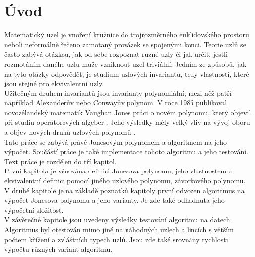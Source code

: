 \chapter*{Úvod}

Matematický uzel je vnoření kružnice do trojrozměrného euklidovského prostoru neboli neformálně řečeno zamotaný provázek se spojenými konci. Teorie uzlů se často zabývá otázkou, jak od sebe rozpoznat různé uzly či jak určit, jestli rozmotáním daného uzlu může vzniknout uzel triviální. Jedním ze způsobů, jak na tyto otázky odpovědět, je studium uzlových invariantů, tedy vlastností, které jsou stejné pro ekvivalentní uzly.
\\
Užitečným druhem invariantů jsou invarianty polynomiální, mezi něž patří například Alexanderův nebo	 Conwayův polynom. 
V roce 1985 publikoval novozélandský matematik Vaughan Jones práci o novém polynomu, který objevil při studiu operátorových algeber  \cite{jones1985}. 
Jeho výsledky měly velký vliv na vývoj oboru a objev nových druhů uzlových polynomů \cite{cromwell2004knots}.
\\
Tato práce se zabývá právě Jonesovým polynomem a algoritmem na jeho výpočet. Součástí práce je také implementace tohoto algoritmu a jeho testování.
\\

Text práce je rozdělen do tří kapitol. 
\\
První kapitola je věnována definici Jonesova polynomu, jeho vlastnostem a ekvivalentní definici pomocí jiného uzlového polynomu, závorkového polynomu.
\\
V druhé kapitole je na základě poznatků kapitoly první odvozen algoritmus na výpočet Jonesova polynomu a jeho varianty. Je zde také odhadnuta jeho výpočetní složitost.
\\
V závěrečné kapitole jsou uvedeny výsledky testování algoritmu na datech. Algoritmus byl otestován mimo jiné na náhodných uzlech a lincích s větším počtem křížení a zvláštních typech uzlů. Jsou zde také srovnány rychlosti výpočtu různých variant algoritmu.

